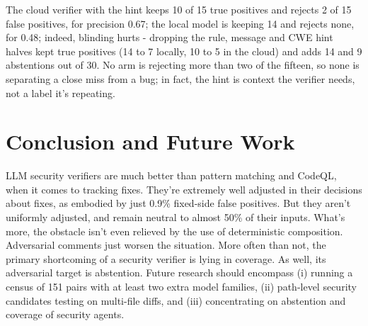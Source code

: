 \documentclass[conference]{IEEEtran}
\begin{document}
The cloud verifier with the hint keeps 10 of 15 true positives and rejects 2 of 15 false positives, for precision 0.67; the local model is keeping 14 and rejects none, for 0.48; indeed, blinding hurts - dropping the rule, message and CWE hint halves kept true positives (14 to 7 locally, 10 to 5 in the cloud) and adds 14 and 9 abstentions out of 30. No arm is rejecting more than two of the fifteen, so none is separating a close miss from a bug; in fact, the hint is context the verifier needs, not a label it's repeating.

\section{Conclusion and Future Work}

LLM security verifiers are much better than pattern matching and CodeQL, when it comes to tracking fixes. They're extremely well adjusted in their decisions about fixes, as embodied by just 0.9\% fixed-side false positives. But they aren't uniformly adjusted, and remain neutral to almost 50\% of their inputs. What's more, the obstacle isn't even relieved by the use of deterministic composition. Adversarial comments just worsen the situation. More often than not, the primary shortcoming of a security verifier is lying in coverage. As well, its adversarial target is abstention. Future research should encompass (i) running a census of 151 pairs with at least two extra model families, (ii) path-level security candidates testing on multi-file diffs, and (iii) concentrating on abstention and coverage of security agents.
\end{document}

